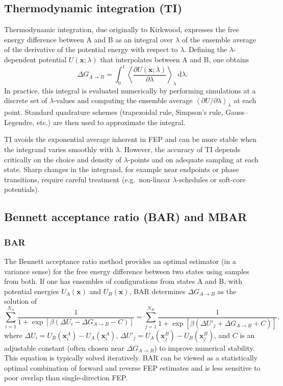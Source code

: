 \documentclass[12pt]{article}
\begin{document}
\subsection{Thermodynamic integration (TI)}

Thermodynamic integration, due originally to Kirkwood, expresses the free energy difference between A and B as an integral over \(\lambda\) of the ensemble average of the derivative of the potential energy with respect to \(\lambda\).\cite{CH10_kirkwood1935ti} 
Defining the \(\lambda\)-dependent potential \(U(\mathbf{x};\lambda)\) that interpolates between A and B, one obtains
\[
\Delta G_{A\to B} 
= \int_0^1 
\left\langle 
\frac{\partial U(\mathbf{x};\lambda)}{\partial \lambda}
\right\rangle_{\lambda}
\, \mathrm{d}\lambda.
\]
In practice, this integral is evaluated numerically by performing simulations at a discrete set of \(\lambda\)-values and computing the ensemble average \(\left\langle \partial U/\partial \lambda \right\rangle_\lambda\) at each point. 
Standard quadrature schemes (trapezoidal rule, Simpson's rule, Gauss--Legendre, etc.) are then used to approximate the integral.\cite{CH10_deruiter2013comparison} 

TI avoids the exponential average inherent in FEP and can be more stable when the integrand varies smoothly with \(\lambda\). 
However, the accuracy of TI depends critically on the choice and density of \(\lambda\)-points and on adequate sampling at each state. 
Sharp changes in the integrand, for example near endpoints or phase transitions, require careful treatment (e.g.\ non-linear \(\lambda\)-schedules or soft-core potentials). 

\subsection{Bennett acceptance ratio (BAR) and MBAR}

\subsubsection{BAR}

The Bennett acceptance ratio method provides an optimal estimator (in a variance sense) for the free energy difference between two states using samples from both.\cite{CH10_bennett1976efficient} 
If one has ensembles of configurations from states A and B, with potential energies \(U_A(\mathbf{x})\) and \(U_B(\mathbf{x})\), BAR determines \(\Delta G_{A\to B}\) as the solution of
\[
\sum_{i=1}^{N_A} 
\frac{1}{1 + \exp\left[ \beta \left( \Delta U_i - \Delta G_{A\to B} - C \right) \right]}
=
\sum_{j=1}^{N_B} 
\frac{1}{1 + \exp\left[ \beta \left( \Delta U'_j + \Delta G_{A\to B} + C \right) \right]},
\]
where \(\Delta U_i = U_B(\mathbf{x}_i^A) - U_A(\mathbf{x}_i^A)\), \(\Delta U'_j = U_A(\mathbf{x}_j^B) - U_B(\mathbf{x}_j^B)\), and \(C\) is an adjustable constant (often chosen near \(\Delta G_{A\to B}\)) to improve numerical stability. 
This equation is typically solved iteratively. 
BAR can be viewed as a statistically optimal combination of forward and reverse FEP estimates and is less sensitive to poor overlap than single-direction FEP.\cite{CH10_bennett1976efficient,CH10_deruiter2013comparison} 
\end{document}
